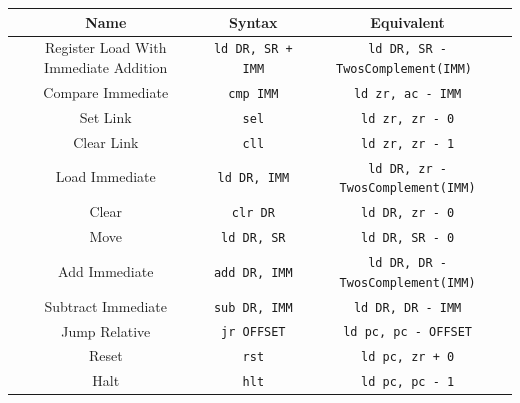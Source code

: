 \begin{center}
    \begin{tabular}{|c|c|c|}
        \hline
        Name & Syntax & Equivalent \\
        \hline
        Register Load With Immediate Addition & \verb |ld DR, SR + IMM| & \verb|ld DR, SR - TwosComplement(IMM) | \\
        \hline
        Compare Immediate & \verb|cmp IMM| & \verb|ld zr, ac - IMM| \\
        \hline
        Set Link & \verb|sel| & \verb|ld zr, zr - 0| \\
        \hline
        Clear Link & \verb|cll| & \verb|ld zr, zr - 1| \\
        \hline
        Load Immediate & \verb|ld DR, IMM| & \verb|ld DR, zr - TwosComplement(IMM)| \\
        \hline
        Clear & \verb|clr DR| & \verb|ld DR, zr - 0| \\
        \hline
        Move & \verb|ld DR, SR| & \verb|ld DR, SR - 0| \\
        \hline
        Add Immediate & \verb|add DR, IMM| & \verb|ld DR, DR - TwosComplement(IMM)| \\
        \hline
        Subtract Immediate & \verb|sub DR, IMM| & \verb|ld DR, DR - IMM| \\
        \hline
        Jump Relative & \verb|jr OFFSET| & \verb|ld pc, pc - OFFSET| \\
        \hline
        Reset & \verb|rst| & \verb|ld pc, zr + 0|\\
        \hline
        Halt & \verb|hlt| & \verb|ld pc, pc - 1| \\
        \hline
    \end{tabular}
\end{center}
